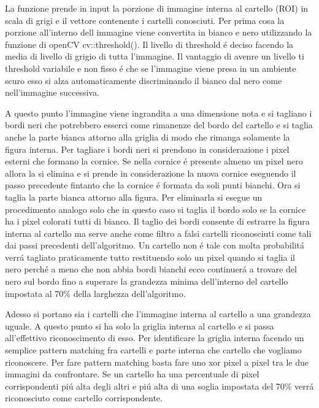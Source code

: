 		La funzione prende in input la porzione di immagine interna al cartello (ROI) in scala di grigi e il vettore contenente i cartelli conosciuti. Per prima cosa la porzione all'interno dell immagine viene convertita in bianco e nero utilizzando la funzione di openCV cv::threshold(). Il livello di threshold \'e deciso facendo la media di livello di grigio di tutta l'immagine. Il vantaggio di avenre un livello ti threshold variabile e non fisso \'e che se l'immagine viene presa in un ambiente scuro esso si alza automaticamente discriminando il bianco dal nero come nell'immagine successiva.
		
		A questo punto l'immagine viene ingrandita a una dimensione nota e si tagliano i bordi neri che potrebbero esserci come rimanenze del bordo del cartello e si taglia anche la parte bianca attorno alla griglia di modo che rimanga solamente la figura interna. Per tagliare i bordi neri si prendono in considerazione i pixel esterni che formano la cornice. Se nella cornice \'e presente almeno un pixel nero allora la si elimina e si prende in considerazione la nuova cornice eseguendo il passo precedente fintanto che la cornice \'e formata da soli punti bianchi. Ora si taglia la parte bianca attorno alla figura. Per eliminarla si esegue un procedimento analogo solo che in questo caso si taglia il bordo solo se la cornice ha i pixel colorati tutti di bianco. Il taglio dei bordi consente di estrarre la figura interna al cartello ma serve anche come filtro a falsi cartelli riconosciuti come tali dai passi precedenti dell'algoritmo. Un cartello non \'e tale con molta probabilit\'a verr\'a tagliato praticamente tutto restituendo solo un pixel quando si taglia il nero perch\'e a meno che non abbia bordi bianchi ecco continuer\'a a trovare del nero sul bordo fino a superare la grandezza minima dell'interno del cartello impostata al 70\% della larghezza dell'algoritmo.
		
		Adesso si portano sia i cartelli che l'immagine interna al cartello a una grandezza uguale.
		A questo punto si ha solo la griglia interna al cartello e si passa all'effettivo riconoscimento di esso. Per identificare la griglia interna facendo un semplice pattern matching fra cartelli e parte interna che cartello che vogliamo riconoscere. Per fare pattern matching basta fare uno xor pixel a pixel tra le due immagini da confrontare. Se un cartello ha una percentuale di pixel corrispondenti pi\'u alta degli altri e pi\'u alta di una soglia impostata del 70\% verr\'a riconosciuto come cartello corrispondente.
		

